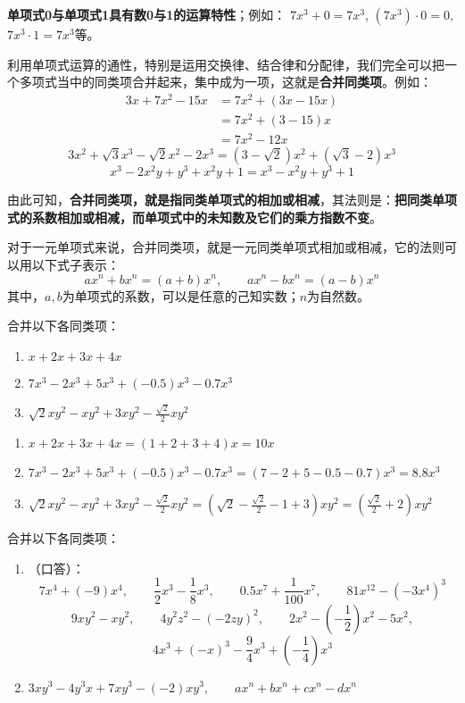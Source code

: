 \textbf{单项式0与单项式1具有数0与1的运算特性}；例如：
$7x^3+0=7x^3$, $(7x^3)\cdot 0=0$, $7x^3\cdot 1=7x^3$等。

利用单项式运算的通性，特别是运用交换律、结合律和分配律，我们完全可以把一个多项式当中的同类项合并起来，集中成为一项，这就是\textbf{合并同类项}。例如：
\begin{align*}
3x+7x^2-15x &= 7x^2+(3x-15x) \tag{交换律，结合律}\\
&=7x^2+(3-15)x \tag{分配律}\\
&=7x^2-12x
\end{align*}
\[3x^2+\sqrt{3}x^3-\sqrt{2}x^2-2x^3=(3-\sqrt{2})x^2+(\sqrt{3}-2)x^3 \]
\[x^3-2x^2y+y^3+x^2y+1=x^3-x^2y+y^3+1 \]

由此可知，\textbf{合并同类项，就是指同类单项式的相加或相减}，其法则是：\textbf{把同类单项式的系数相加或相减，而单项式中的未知数及它们的乘方指数不变}。

对于一元单项式来说，合并同类项，就是一元同类单项式相加或相减，它的法则可以用以下式子表示：
\[\boxed{ax^n +bx^n = (a+b)x^n,\qquad  ax^n -bx^n =(a-b)x^n}\]
其中，$a,b$为单项式的系数，可以是任意的己知实数；$n$为自然数。

\begin{example}
    合并以下各同类项：
    \begin{enumerate}
        \item $x+2x+3x+4x$
        \item $7x^3-2x^3+5x^3+(-0.5)x^3-0.7x^3$
        \item $\sqrt{2}xy^2-xy^2+3xy^2-\frac{\sqrt{2}}{2}xy^2  $
    \end{enumerate}
\end{example}

\begin{solution}
    \begin{enumerate}
        \item $x+2x+3x+4x=(1+2+3+4)x=10x$
        \item $7x^3-2x^3+5x^3+(-0.5)x^3-0.7x^3=(7-2+5-0.5-0.7)x^3=8.8x^3$
        \item $\sqrt{2}xy^2-xy^2+3xy^2-\frac{\sqrt{2}}{2}xy^2=\left(\sqrt{2}-\frac{\sqrt{2}}{2}-1+3\right)xy^2=\left(\frac{\sqrt{2}}{2}+2\right)xy^2$
    \end{enumerate}
\end{solution}

\begin{ex}
    合并以下各同类项：
\begin{enumerate}
    \item （口答）：
    \[7x^4+(-9)x^4,\qquad \frac{1}{2}x^3-\frac{1}{8}x^3,\qquad 0.5x^7+\frac{1}{100}x^7,\qquad 81x^{12}-(-3x^4)^3\]
    \[ 9xy^2-xy^2 ,\qquad 4y^2z^2-(-2zy)^2,\qquad 2x^2-\left(-\frac{1}{2}\right)x^2-5x^2,\]\[ 4x^3+(-x)^3-\frac{9}{4}x^3+\left(-\frac{1}{4}\right)x^3 \]
    \item $3xy^3-4y^3x+7xy^3-(-2)xy^3,\qquad ax^n+bx^n+cx^n-dx^n$
\end{enumerate}
\end{ex}

